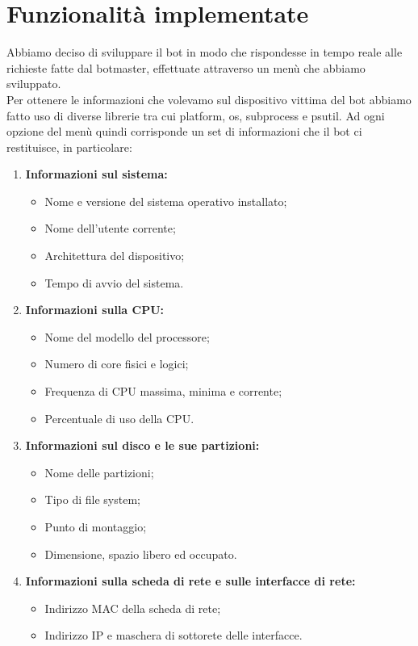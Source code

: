 \documentclass[a4paper]{report}
\begin{document}
\section{Funzionalità implementate}
Abbiamo deciso di sviluppare il bot in modo che rispondesse in tempo reale alle richieste fatte dal botmaster, effettuate attraverso un menù che abbiamo sviluppato.\\
Per ottenere le informazioni che volevamo sul dispositivo vittima del bot abbiamo fatto uso di diverse librerie tra cui platform, os, subprocess e psutil.
Ad ogni opzione del menù quindi corrisponde un set di informazioni che il bot ci restituisce, in particolare:
\\
\begin{enumerate}
	
	\item \textbf{Informazioni sul sistema:}
	\begin{itemize}
		\item Nome e versione del sistema operativo installato;
		\item Nome dell'utente corrente;
		\item Architettura del dispositivo;
		\item Tempo di avvio del sistema.
	\end{itemize}
	
	\item \textbf{Informazioni sulla CPU:}
	\begin{itemize}
		\item Nome del modello del processore;
		\item Numero di core fisici e logici;
		\item Frequenza di CPU massima, minima e corrente;
		\item Percentuale di uso della CPU.
	\end{itemize}
	
	\item \textbf{Informazioni sul disco e le sue partizioni:}
	\begin{itemize}
		\item Nome delle partizioni;
		\item Tipo di file system;
		\item Punto di montaggio;
		\item Dimensione, spazio libero ed occupato.
	\end{itemize}
	
	\item \textbf{Informazioni sulla scheda di rete e sulle interfacce di rete:}
	\begin{itemize}
		\item Indirizzo MAC della scheda di rete;
		\item Indirizzo IP e maschera di sottorete delle interfacce.
	\end{itemize}
	

\end{enumerate}
\end{document}
